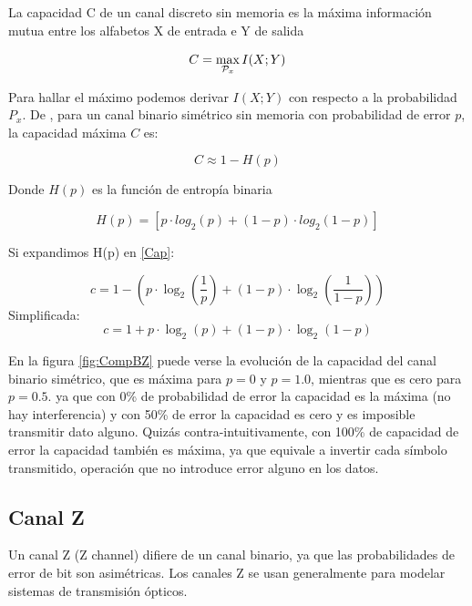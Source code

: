 La capacidad C de un canal discreto sin memoria es la máxima información mutua entre los alfabetos X de entrada e Y de salida

\begin{equation}
C = \max_{{\cal{P}}_x} I(X;Y) 
\end{equation}

Para hallar el máximo podemos derivar $I(X;Y)$ con respecto a la probabilidad $P_x$.
De \cite{MacKay:2002}, para un canal binario simétrico sin memoria con probabilidad de error $p$, la capacidad máxima $C$ es:

\begin{equation}\label{Cap}
C \approx 1 - H(p) 
\end{equation}

Donde $H(p)$ es la función de entropía binaria

\begin{equation}\label{Hp}
 H(p) = [p \cdot log_2(p) + (1-p)\cdot log_2 (1-p)]
\end{equation}

Si expandimos H(p) en \ref{Cap}:

$$ c = 1-\left(p \cdot \log_2\left(\frac{1}{p}\right) + (1-p) \cdot \log_2\left(\frac{1}{1-p}\right)\right) $$
Simplificada:
$$ c = 1 + p \cdot \log_2(p) + (1 - p) \cdot \log_2(1-p) $$

En la figura \ref{fig:CompBZ} puede verse la evolución de la capacidad del canal binario simétrico, que es máxima para $p=0$ y $p=1.0$, mientras que es cero para $p=0.5$. ya que con 0\% de probabilidad de error la capacidad es la máxima (no hay interferencia) y con 50\% de error la capacidad es cero y es imposible transmitir dato alguno. Quizás contra-intuitivamente, con 100\% de capacidad de error la capacidad también es máxima, ya que equivale a invertir cada símbolo transmitido, operación que no introduce error alguno en los datos.


\subsection{Canal Z}
\label{canalZ}
Un canal Z (Z channel) difiere de un canal binario, ya que las probabilidades de error de bit son asimétricas.
Los canales Z se usan generalmente para modelar sistemas de transmisión ópticos.

